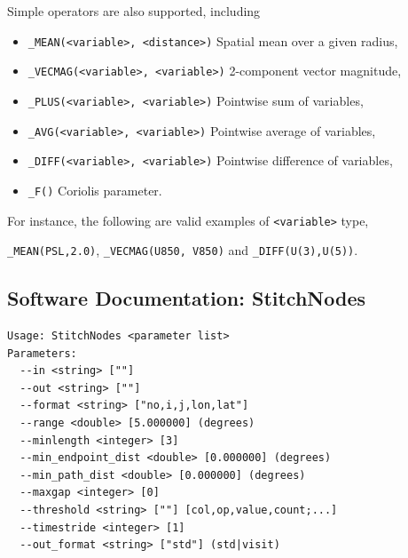 \documentclass[gmdd, hvmath, online]{copernicus_discussions}
\begin{document}
Simple operators are also supported, including
\begin{itemize}
\item[] \texttt{\_MEAN(<variable>, <distance>)} Spatial mean over a given radius,
\item[] \texttt{\_VECMAG(<variable>, <variable>)} 2-component vector magnitude,
\item[] \texttt{\_PLUS(<variable>, <variable>)} Pointwise sum of variables,
\item[] \texttt{\_AVG(<variable>, <variable>)} Pointwise average of variables,
\item[] \texttt{\_DIFF(<variable>, <variable>)} Pointwise difference of variables,
\item[] \texttt{\_F()}  Coriolis parameter.
\end{itemize}  For instance, the following are valid examples of \texttt{<variable>} type,
\begin{center}
\texttt{\_MEAN(PSL,2.0)}, \quad \texttt{\_VECMAG(U850, V850)} \quad and \quad \texttt{\_DIFF(U(3),U(5))}.
\end{center}

\subsection{Software Documentation: StitchNodes} \label{sec:StitchNodesAppendix}

\begin{verbatim}
Usage: StitchNodes <parameter list>
Parameters:
  --in <string> [""] 
  --out <string> [""] 
  --format <string> ["no,i,j,lon,lat"] 
  --range <double> [5.000000] (degrees)
  --minlength <integer> [3] 
  --min_endpoint_dist <double> [0.000000] (degrees)
  --min_path_dist <double> [0.000000] (degrees)
  --maxgap <integer> [0] 
  --threshold <string> [""] [col,op,value,count;...]
  --timestride <integer> [1] 
  --out_format <string> ["std"] (std|visit)
\end{verbatim}
\end{document}
